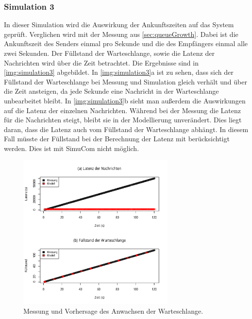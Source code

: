 \subsubsection{Simulation 3}
\label{sec:simulation3}
In dieser Simulation wird die Auswirkung der Ankunftszeiten auf das System geprüft. Verglichen wird mit der Messung aus \autoref{sec:queueGrowth}. Dabei ist die Ankunftszeit des Senders einmal pro Sekunde und die des Empfängers einmal alle zwei Sekunden. Der Füllstand der Warteschlange, sowie die Latenz der Nachrichten wird über die Zeit betrachtet.
Die Ergebnisse sind in \autoref{img:simulation3} abgebildet. In \autoref{img:simulation3}a ist zu sehen, dass sich der Füllstand der Warteschlange bei Messung und Simulation gleich verhält und über die Zeit ansteigen, da jede Sekunde eine Nachricht in der Warteschlange unbearbeitet bleibt. In \autoref{img:simulation3}b sieht man außerdem die Auswirkungen auf die Latenz der einzelnen Nachrichten. Während bei der Messung die Latenz für die Nachrichten steigt, bleibt sie in der Modellierung unverändert. Dies liegt daran, dass die Latenz auch vom Füllstand der Warteschlange abhängt. In diesem Fall müsste der Füllstand bei der Berechnung der Latenz mit berücksichtigt werden. Dies ist mit SimuCom nicht möglich. 
\begin{figure}
\center
  \includegraphics[width=0.7\textwidth]{images/modelSimulationResults/simulation3.pdf}
  \caption{Messung und Vorhersage des Anwachsen der Warteschlange.}
  \label{img:simulation3}
\end{figure}

